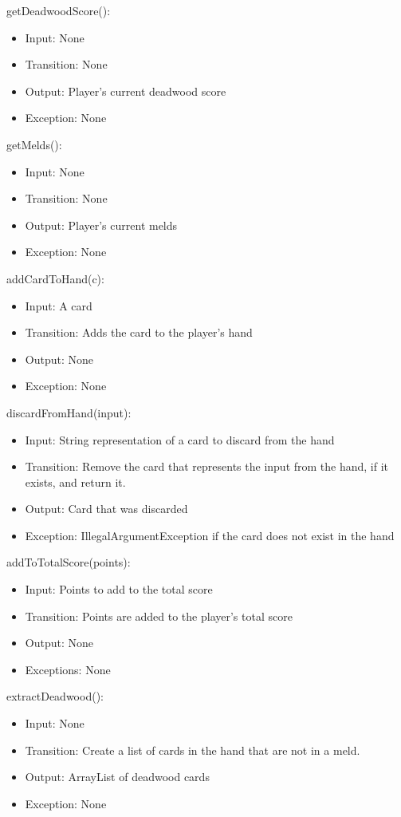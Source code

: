 \documentclass[12pt, titlepage]{article}
\begin{document}
\noindent getDeadwoodScore():
\begin{itemize}
    \item Input: None
    \item Transition: None
    \item Output: Player's current deadwood score
    \item Exception: None
\end{itemize}

\noindent getMelds():
\begin{itemize}
    \item Input: None
    \item Transition: None
    \item Output: Player's current melds
    \item Exception: None
\end{itemize}

\noindent addCardToHand(c):
\begin{itemize}
    \item Input: A card
    \item Transition: Adds the card to the player's hand
    \item Output: None
    \item Exception: None
\end{itemize}

\noindent discardFromHand(input):
\begin{itemize}
    \item Input: String representation of a card to discard from the hand
    \item Transition: Remove the card that represents the input from the hand, if it exists, and return it.
    \item Output: Card that was discarded
    \item Exception: IllegalArgumentException if the card does not exist in the hand
\end{itemize}

\noindent addToTotalScore(points):
\begin{itemize}
    \item Input: Points to add to the total score
    \item Transition: Points are added to the player's total score
    \item Output: None
    \item Exceptions: None
\end{itemize}

\noindent extractDeadwood():
\begin{itemize}
    \item Input: None
    \item Transition: Create a list of cards in the hand that are not in a meld.
    \item Output: ArrayList of deadwood cards
    \item Exception: None
\end{itemize}
\end{document}
